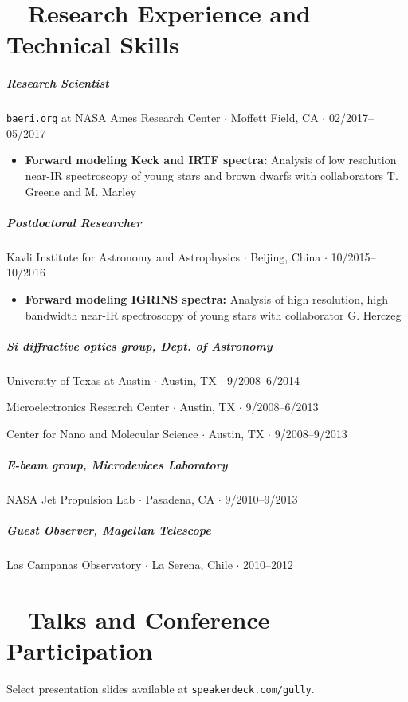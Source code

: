 \documentclass[10pt,letterpaper]{article}
\begin{document}
\section*{\faWrench ~ Research Experience and Technical Skills}

\subparagraph{Research Scientist}
\texttt{baeri.org} at NASA Ames Research Center $\cdot$ Moffett Field, CA $\cdot$ 02/2017--05/2017
\begin{itemize}
    \item  \textbf{Forward modeling Keck and IRTF spectra:} Analysis of low resolution near-IR spectroscopy of young stars and brown dwarfs with collaborators T. Greene and M. Marley
\end{itemize}

\subparagraph{Postdoctoral Researcher}
Kavli Institute for Astronomy and Astrophysics $\cdot$ Beijing, China $\cdot$ 10/2015--10/2016
\begin{itemize}
    \item  \textbf{Forward modeling IGRINS spectra:} Analysis of high resolution, high bandwidth near-IR spectroscopy of young stars with collaborator G. Herczeg
\end{itemize}

\subparagraph{Si diffractive optics group, Dept. of Astronomy}
University of Texas at Austin $\cdot$ Austin, TX $\cdot$ 9/2008--6/2014
\begin{flushright}
Microelectronics Research Center $\cdot$ Austin, TX $\cdot$ 9/2008--6/2013

Center for Nano and Molecular Science $\cdot$ Austin, TX $\cdot$ 9/2008--9/2013
\end{flushright}


\subparagraph{E-beam group, Microdevices Laboratory}
NASA Jet Propulsion Lab $\cdot$ Pasadena, CA $\cdot$ 9/2010--9/2013

\subparagraph{Guest Observer, Magellan Telescope}
Las Campanas Observatory $\cdot$ La Serena, Chile $\cdot$ 2010--2012


\section*{\faSlideshare ~ Talks and Conference Participation}

Select presentation slides available at \texttt{speakerdeck.com/gully}.
\end{document}
